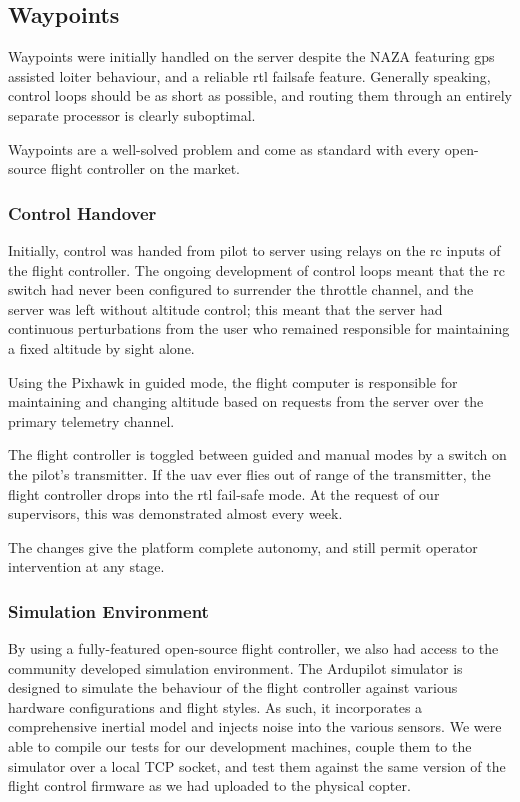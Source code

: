 \documentclass[a4paper, 11pt, titlepage]{article}
\begin{document}
    \subsection{Waypoints}
      Waypoints were initially handled on the server despite the NAZA featuring \gls{gps} assisted loiter behaviour, and a reliable \gls{rtl} failsafe feature.  Generally speaking, control loops should be as short as possible, and routing them through an entirely separate processor is clearly suboptimal.
      
      Waypoints are a well-solved problem and come as standard with every open-source flight controller on the market.

    \subsubsection{Control Handover}
      Initially, control was handed from pilot to server using relays on the \gls{rc} inputs of the flight controller.  The ongoing development of control loops meant that the \gls{rc} switch had never been configured to surrender the throttle channel, and the server was left without altitude control;  this meant that the server had continuous perturbations from the user who remained responsible for maintaining a fixed altitude by sight alone.

      Using the Pixhawk in guided mode, the flight computer is responsible for maintaining and changing altitude based on requests from the server over the primary telemetry channel.
      
      The flight controller is toggled between guided and manual modes by a switch on the pilot's transmitter.  If the \gls{uav} ever flies out of range of the transmitter, the flight controller drops into the \gls{rtl} fail-safe mode.  At the request of our supervisors, this was demonstrated almost every week.

      The changes give the platform complete autonomy, and still permit operator intervention at any stage.

    \subsubsection{Simulation Environment}
      By using a fully-featured open-source flight controller, we also had access to the community developed simulation environment.  
      The Ardupilot simulator is designed to simulate the behaviour of the flight controller against various hardware configurations and flight styles.  As such, it incorporates a comprehensive inertial model and injects noise into the various sensors.
      We were able to compile our tests for our development machines, couple them to the simulator over a local TCP socket, and test them against the same version of the flight control firmware as we had uploaded to the physical copter.
\end{document}
